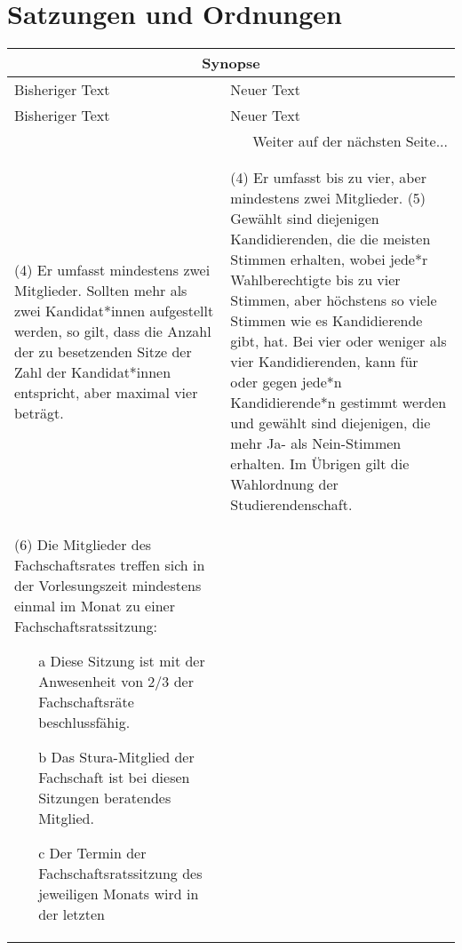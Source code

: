 \section{Satzungen und Ordnungen}

    {\begin{longtable}{|p{7.5cm}|p{7.5cm}|}
        \hline
        \multicolumn{2}{|c|}{Synopse}\\\hline
        Bisheriger Text & Neuer Text \\\hline
        \endfirsthead
        \hline
        Bisheriger Text & Neuer Text \\
        \hline
        \endhead
        \multicolumn{2}{|r|}{Weiter auf der nächsten Seite...}\\
        \hline
        \endfoot
        \hline
        \multicolumn{2}{c}{Ende der Synopse} \\
        \endlastfoot
        \multicolumn{2}{|c|}{§3}\\\hline
        (4) Er umfasst mindestens zwei Mitglieder. Sollten mehr als zwei Kandidat*innen
        aufgestellt werden, so gilt, dass die Anzahl der zu besetzenden Sitze der Zahl der
        Kandidat*innen entspricht, aber maximal vier beträgt.
    &   (4) Er umfasst bis zu vier, aber mindestens zwei Mitglieder.\newline 
        (5) Gewählt sind diejenigen Kandidierenden, die die meisten Stimmen erhalten, wobei
        jede*r Wahlberechtigte bis zu vier Stimmen, aber höchstens so viele Stimmen wie es
        Kandidierende gibt, hat. Bei vier oder weniger als vier Kandidierenden, kann für oder
        gegen jede*n Kandidierende*n gestimmt werden und gewählt sind diejenigen, die mehr
        Ja- als Nein-Stimmen erhalten. Im Übrigen gilt die Wahlordnung der
        Studierendenschaft.\\\hline
        (6) Die Mitglieder des Fachschaftsrates treffen sich in der Vorlesungszeit mindestens
        einmal im Monat zu einer Fachschaftsratssitzung:
        \begin{enumerate}
            \item[a] Diese Sitzung ist mit der Anwesenheit von 2/3 der Fachschaftsräte beschlussfähig.
            \item[b] Das Stura-Mitglied der Fachschaft ist bei diesen Sitzungen beratendes Mitglied.
            \item[c] Der Termin der Fachschaftsratssitzung des jeweiligen Monats wird in der letzten

\end{enumerate}
\end{longtable}}
